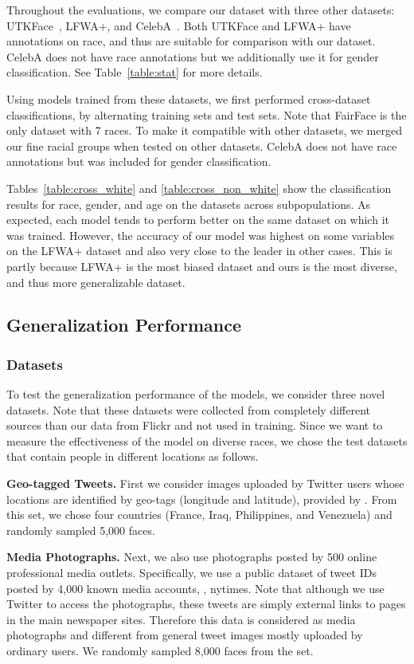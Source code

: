 Throughout the evaluations, we compare our dataset with three other datasets: UTKFace~\cite{zhang2017age}, LFWA+, and CelebA~\cite{liu2015faceattributes}. Both UTKFace and LFWA+ have annotations on race, and thus are suitable for comparison with our dataset. CelebA does not have race annotations but we additionally use it for gender classification. See Table~\ref{table:stat} for more details. 



Using models trained from these datasets, we first performed cross-dataset classifications, by alternating training sets and test sets. Note that FairFace is the only dataset with 7 races. To make it compatible with other datasets, we merged our fine racial groups when tested on other datasets. CelebA does not have race annotations but was included for gender classification. 

Tables~\ref{table:cross_white} and \ref{table:cross_non_white} show the classification results for race, gender, and age on the datasets across subpopulations. As expected, each model tends to perform better on the same dataset on which it was trained. However, the accuracy of our model was highest on some variables on the LFWA+ dataset and also very close to the leader in other cases. This is partly because LFWA+ is the most biased dataset and ours is the most diverse, and thus more generalizable dataset. 


\subsection{Generalization Performance}
\subsubsection{Datasets}
To test the generalization performance of the models, we consider three novel datasets. Note that these datasets were collected from completely different sources than our data from Flickr and not used in training. Since we want to measure the effectiveness of the model on diverse races, we chose the test datasets that contain people in different locations as follows.

\textbf{Geo-tagged Tweets.} 
First we consider images uploaded by Twitter users whose locations are identified by geo-tags (longitude and latitude), provided by \cite{steinert2018twitter}. From this set, we chose four countries (France, Iraq, Philippines, and Venezuela) and randomly sampled 5,000 faces. 

\textbf{Media Photographs.} 
Next, we also use photographs posted by 500 online professional media outlets. Specifically, we use a public dataset of tweet IDs \cite{DVN/2FIFLH_2017} posted by 4,000 known media accounts, \eg, nytimes. Note that although we use Twitter to access the photographs, these tweets are simply external links to pages in the main newspaper sites. Therefore this data is considered as media photographs and different from general tweet images mostly uploaded by ordinary users. We randomly sampled 8,000 faces from the set.


